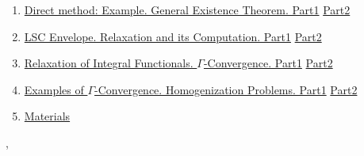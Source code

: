 \documentclass[11pt]{article}
\renewcommand{\today}{\shortmonthname[\the\month] \the \day,  \the\year}
\begin{document}
\begin{enumerate}
	\item  \href{https://mp.weixin.qq.com/s/vyWOgnlj0V12fC3LTSj7pg}{Direct method: Example. General Existence Theorem. Part1} \quad \href{https://mp.weixin.qq.com/s/3pOGFKjtdrQSdWemt453Ew}{Part2} %
	\item  \href{https://mp.weixin.qq.com/s/YI_Xje7ZaywfC61tAKZtGw}{LSC Envelope. Relaxation and its Computation. Part1} \quad \href{https://mp.weixin.qq.com/s/BXWPSYLB0RWQqdcJSUUY8A}{Part2} %
	\item  \href{https://mp.weixin.qq.com/s/mng-S1TkWvOE-k8m8NNwQQ}{Relaxation of Integral Functionals. $\Gamma$-Convergence. Part1} \quad \href{https://mp.weixin.qq.com/s/YXRdmIl0jyM-UX9Vf-EErQ}{Part2} %
	\item  \href{https://mp.weixin.qq.com/s/h7ShM-M-j_plHZpxxcTSnQ}{Examples of $\Gamma$-Convergence. Homogenization Problems. Part1} \quad \href{https://mp.weixin.qq.com/s/RYN3DERJapgNnpvL9ygh-w}{Part2} %
	\item \href{https://pan.baidu.com/s/1NI71kBUtCYHTCu51Ses-0A?pwd=1121}{Materials}
\end{enumerate}
%
\begin{flushright}
	\tiny \today 
\end{flushright}
\end{document}

